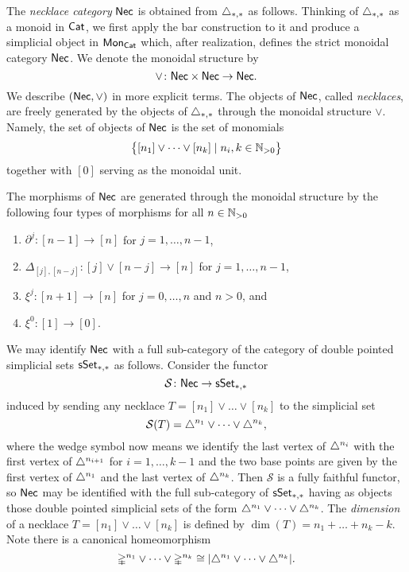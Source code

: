 
The \textit{necklace category} $\mathsf{Nec}$ is obtained from $\triangle_{*,*}$ as follows.
Thinking of $\triangle_{*,*}$ as a monoid in $\mathsf{Cat}$, we first apply the bar construction to it and produce a simplicial object in $\mathsf{Mon}_{\mathsf{Cat}}$ which, after realization, defines the strict monoidal category $\mathsf{Nec}$.
We denote the monoidal structure by
\[
\vee \colon \mathsf{Nec} \times \mathsf{Nec} \to \mathsf{Nec}.
\]
We describe $(\mathsf{Nec}, \vee)$ in more explicit terms.
The objects of $\mathsf{Nec}$, called \textit{necklaces}, are freely generated by the objects of $\triangle_{*,*}$ through the monoidal structure $\vee$.
Namely, the set of objects of $\mathsf{Nec}$ is the set of monomials
\[
\big\{ [n_1] \vee \dots \vee[n_k] \mid n_i, k \in \mathbb{N}_{>0} \big\}
\]
together with $[0]$ serving as the monoidal unit.

The morphisms of $\mathsf{Nec}$ are generated through the monoidal structure by the following four types of morphisms for all $n \in\mathbb{N}_{>0}$
\begin{enumerate}
	\item $\partial^j \colon [n-1] \to [n]$ for $j = 1, \dots, n-1$,
	\item $\Delta_{[j], [n-j]} \colon [j] \vee [n-j] \to [n]$ for $j = 1, \dots, n-1$,
	\item $\xi^j \colon [n+1] \to [n]$ for $j = 0, \dots, n$ and $n>0$, and
	\item $\xi^0 \colon [1] \to [0]$.
\end{enumerate}
We may identify $\mathsf{Nec}$ with a full sub-category of the category of double pointed simplicial sets $\mathsf{sSet}_{*,*}$ as follows.
Consider the functor
\[
\mathcal{S} \colon \mathsf{Nec} \to \mathsf{sSet}_{*,*}
\]
induced by sending any necklace $T = [n_1] \vee \dots \vee[n_k]$ to the simplicial set
\[
\mathcal{S}(T) = \triangle^{n_1} \vee \dots \vee \triangle^{n_k},
\]
where the wedge symbol now means we identify the last vertex of $\triangle^{n_i}$ with the first vertex of $\triangle^{n_{i+1}}$ for $i = 1, \dots, k-1$ and the two base points are given by the first vertex of $\triangle^{n_1}$ and the last vertex of $\triangle^{n_k}$.
Then $\mathcal{S}$ is a fully faithful functor, so $\mathsf{Nec}$ may be identified with the full sub-category of $\mathsf{sSet}_{*,*}$ having as objects those double pointed simplicial sets of the form $\triangle^{n_1} \vee \dots \vee \triangle^{n_k}$.
The \textit{dimension} of a necklace $T = [n_1] \vee\dots\vee [n_k]$ is defined by $\dim(T) = n_1 + \dots + n_k-k$. Note there is a canonical homeomorphism \[\mathbb{\Delta}^{n_1} \vee \cdots \vee \mathbb{\Delta}^{n_k} \cong | \triangle^{n_1} \vee \cdots \vee \triangle^{n_k}|.\] 



